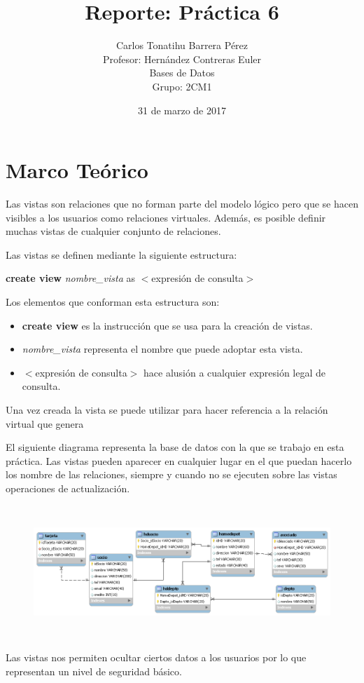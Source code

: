 \documentclass[12pt, titlepage]{article}
\title{Reporte: Práctica 6}
\author{Carlos Tonatihu Barrera Pérez \\ Profesor: Hernández Contreras Euler \\ Bases de Datos \\ Grupo: 2CM1 }
\date{31 de marzo de 2017}
\begin{document}
	\maketitle
	\tableofcontents
	\section{Marco Teórico}
	Las vistas son relaciones que no forman parte del modelo lógico pero que se hacen visibles a los usuarios como relaciones virtuales. Además, es posible definir muchas vistas de cualquier conjunto de relaciones.\cite{LIBRO}
	
	Las vistas se definen mediante la siguiente estructura:
	\begin{center}
		\textbf{create view} \textit{nombre\_vista} as $<$expresión de consulta$>$
	\end{center}
	Los elementos que conforman esta estructura son:
	\begin{itemize}
		\item \textbf{create view} es la instrucción que se usa para la creación de vistas.
		\item \textit{nombre\_vista} representa el nombre que puede adoptar esta vista.
		\item $<$expresión de consulta$>$ hace alusión a cualquier expresión legal de consulta.
	\end{itemize}
	Una vez creada la vista se puede utilizar para hacer referencia a la relación virtual que genera
	
	El siguiente diagrama representa la base de datos con la que se trabajo en esta práctica. Las vistas pueden aparecer en cualquier lugar en el que puedan hacerlo los nombre de las relaciones, siempre y cuando no se ejecuten sobre las vistas operaciones de actualización.
	 \begin{figure}[H]
		\begin{center}
			\includegraphics[width=16cm, height=5cm]{home.png}
			\label{fig:home}
		\end{center}
	\end{figure}
	Las vistas nos permiten ocultar ciertos datos a los usuarios por lo que representan un nivel de seguridad básico.
\end{document}
